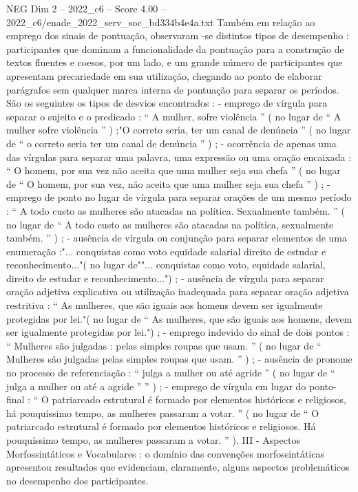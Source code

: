 \begin{textsample}{NEG Dim 2 – 2022\_c6 – Score 4.00 – 2022\_c6/enade\_2022\_serv\_soc\_bd334b4e4a.txt}
Também em relação ao emprego dos sinais de pontuação, observaram -se distintos tipos de desempenho : participantes que dominam a funcionalidade da pontuação para a construção de textos fluentes e coesos, por um lado, e um grande número de participantes que apresentam precariedade em sua utilização, chegando ao ponto de elaborar parágrafos sem qualquer marca interna de pontuação para separar os períodos.
São os seguintes os tipos de desvios encontrados : - emprego de vírgula para separar o sujeito e o predicado : “ A mulher, sofre violência ” ( no lugar de “ A mulher sofre violência ” ) ;"O correto seria, ter um canal de denúncia ” ( no lugar de “ o correto seria ter um canal de denúncia ” ) ; - ocorrência de apenas uma das vírgulas para separar uma palavra, uma expressão ou uma oração encaixada : “ O homem, por sua vez não aceita que uma mulher seja sua chefa ” ( no lugar de “ O homem, por sua vez, não aceita que uma mulher seja sua chefa ” ) ; - emprego de ponto no lugar de vírgula para separar orações de um mesmo período : “ A todo custo as mulheres são atacadas na política.
Sexualmente também. ” ( no lugar de “ A todo custo as mulheres são atacadas na política, sexualmente também. ” ) ; - ausência de vírgula ou conjunção para separar elementos de uma enumeração :"... conquistas como voto equidade salarial direito de estudar e reconhecimento..."( no lugar de""... conquistas como voto, equidade salarial, direito de estudar e reconhecimento...") ; - ausência de vírgula para separar oração adjetiva explicativa ou utilização inadequada para separar oração adjetiva restritiva : “ As mulheres, que são iguais aos homens devem ser igualmente protegidas por lei."( no lugar de “ As mulheres, que são iguais aos homens, devem ser igualmente protegidas por lei.") ; - emprego indevido do sinal de dois pontos : “ Mulheres são julgadas : pelas simples roupas que usam. ” ( no lugar de “ Mulheres são julgadas pelas simples roupas que usam. ” ) ; - ausência de pronome no processo de referenciação : “ julga a mulher ou até agride ” ( no lugar de “ julga a mulher ou até a agride ” ” ) ; - emprego de vírgula em lugar do ponto-final : “ O patriarcado estrutural é formado por elementos históricos e religiosos, há pouquíssimo tempo, as mulheres passaram a votar. ” ( no lugar de “ O patriarcado estrutural é formado por elementos históricos e religiosos.
Há pouquíssimo tempo, as mulheres passaram a votar. ” ).
III - Aspectos Morfossintáticos e Vocabulares : o domínio das convenções morfossintáticas apresentou resultados que evidenciam, claramente, alguns aspectos problemáticos no desempenho dos participantes.

\end{textsample}
